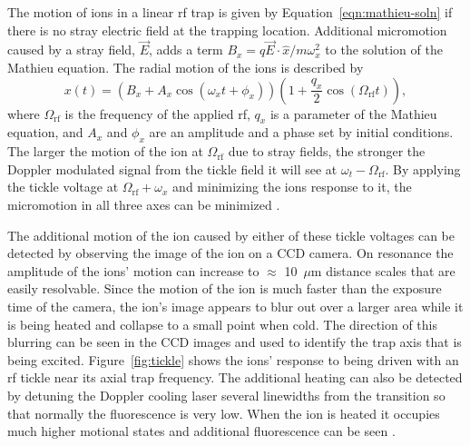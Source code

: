 The motion of ions in a linear rf trap is given by Equation~\ref{eqn:mathieu-soln} if there is no stray electric field at the trapping location.  Additional micromotion caused by a stray field, $\vec{E}$, adds a term $B_x = q \vec{E} \cdot \hat{x} / m \omega_x^2$ to the solution of the Mathieu equation.  The radial motion of the ions is described by
\begin{equation}
	x(t) = \left( B_x + A_x \cos( \omega_x t + \phi_x ) \right) \left( 1 + \frac{q_x}{2} \cos( \Omega_\mathrm{rf} t ) \right) \mathrm{,}
\end{equation}
where $\Omega_\mathrm{rf}$ is the frequency of the applied rf, $q_x$ is a parameter of the Mathieu equation, and $A_x$ and $\phi_x$ are an amplitude and a phase set by initial conditions.  The larger the motion of the ion at $\Omega_\mathrm{rf}$ due to stray fields, the stronger the Doppler modulated signal from the tickle field it will see at $\omega_t - \Omega_\mathrm{rf}$.  By applying the tickle voltage at $\Omega_\mathrm{rf} + \omega_x$ and minimizing the ions response to it, the micromotion in all three axes can be minimized \cite{Ibaraki:11,Mount:13}.  

The additional motion of the ion caused by either of these tickle voltages can be detected by observing the image of the ion on a CCD camera.  On resonance the amplitude of the ions' motion can increase to $\approx$ 10~$\mu$m distance scales that are easily resolvable.  Since the motion of the ion is much faster than the exposure time of the camera, the ion's image appears to blur out over a larger area while it is being heated and collapse to a small point when cold.  The direction of this blurring can be seen in the CCD images and used to identify the trap axis that is being excited.  Figure~\ref{fig:tickle} shows the ions' response to being driven with an rf tickle near its axial trap frequency.  The additional heating can also be detected by detuning the Doppler cooling laser several linewidths from the transition so that normally the fluorescence is very low.  When the ion is heated it occupies much higher motional states and additional fluorescence can be seen \cite{Mount:13}.


